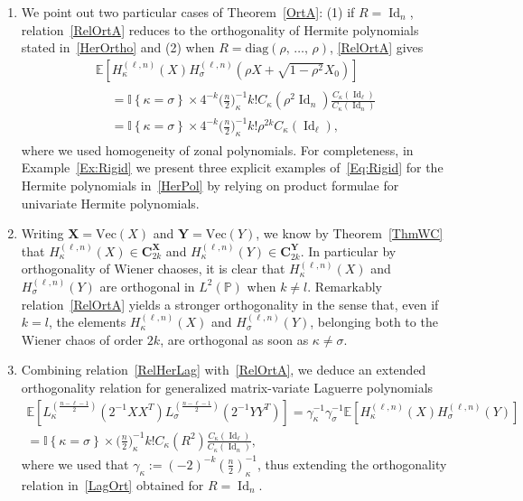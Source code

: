 \documentclass[AHL,Unicode,longabstracts,published]{cedram}
\DeclareMathOperator{\Id}{Id}
\newcommand{\diag}{\mathrm{diag}}
\renewcommand{\Vec}{\mathrm{Vec}}
\newcommand{\bfX}{\mathbf{X}}
\newcommand{\bfC}{\mathbf{C}}
\newcommand{\bfY}{\mathbf{Y}}
\newcommand{\Prob}{\mathbb{P}}
\newcommand{\E}[1]{\mathbb{E}\left[#1\right]}
\newcommand{\eqLaw}{ \overset{\mathcal{L}}{=} }
\newcommand{\ind}[1]{\mathbb{I}
\left\{#1\right\}}
\begin{document}
\begin{rema}
\begin{enumerate}
\begin{multline*}
\end{multline*}
where we used the fact that $f(X)=f(XO)$ and $g(XO^T)=g(X)$ since $f,g\in \Pi(\ell,n)$ as well as the fact that $(XO,X_0O)\eqLaw(X,X_0)$, showing in particular that $|r_j|\leq 1$ for every $j=1,\,\ldots,\,n$.
\item We point out two particular cases of Theorem~\ref{OrtA}: (1) if $R=\Id_n$, relation~\eqref{RelOrtA} reduces to the orthogonality of Hermite polynomials stated in~\eqref{HerOrtho} and (2) when $R= \diag(\rho,\,\ldots,\,\rho)$, \eqref{RelOrtA} gives
\begin{multline}\label{Eq:Rigid}
\E{H_{\kappa}^{(\ell,n)}(X) H_{\sigma}^{(\ell,n)}\left(\rho X+\sqrt{1-\rho^2}X_0\right)}\\
\begin{aligned}
&= \ind{\kappa=\sigma}\times 4^{-k}\bigg(\frac{n}{2}\bigg)_{\kappa}^{-1} k ! C_{\kappa}\left(\rho^2 \Id_n\right)\frac{C_{\kappa}(\Id_{\ell})}{C_{\kappa}(\Id_n)} \\
&= \ind{\kappa=\sigma}\times 4^{-k}\bigg(\frac{n}{2}\bigg)_{\kappa}^{-1} k ! \rho^{2k}C_{\kappa}(\Id_{\ell}), 
\end{aligned}
\end{multline}
where we used homogeneity of zonal polynomials. For completeness, in Example~\ref{Ex:Rigid} we present three explicit examples of~\eqref{Eq:Rigid} for the Hermite polynomials in~\eqref{HerPol} by relying on product formulae for univariate Hermite polynomials.
\item Writing $\bfX = \Vec(X)$ and $ \bfY = \Vec(Y)$, we know by Theorem~\ref{ThmWC} that $H_{\kappa}^{(\ell,n)}(X) \in \bfC_{2k}^{\bfX}$ and $H_{\kappa}^{(\ell,n)}(Y) \in \bfC_{2k}^{\bfY}$. In particular by orthogonality of Wiener chaoses, it is clear that $H_{\kappa}^{(\ell,n)}(X)$ and $H_{\sigma}^{(\ell,n)}(Y)$ are orthogonal in $L^2(\Prob)$ when $k\neq l$. Remarkably relation~\eqref{RelOrtA} yields a stronger orthogonality in the sense that, even if $k=l$, the elements $H_{\kappa}^{(\ell,n)}(X)$ and $H_{\sigma}^{(\ell,n)}(Y)$, belonging both to the Wiener chaos of order $2k$, are orthogonal as soon as $\kappa \neq \sigma$.
\item Combining relation~\eqref{RelHerLag} with~\eqref{RelOrtA}, we deduce an extended orthogonality relation for generalized matrix-variate Laguerre polynomials
\begin{gather*}
\E{L_{\kappa}^{\left(\frac{n-\ell-1}{2}\right)}\left(2^{-1}XX^T\right) L_{\sigma}^{\left(\frac{n-\ell-1}{2}\right)}\left(2^{-1}YY^T\right)} = \gamma_{\kappa}^{-1}
\gamma_{\sigma}^{-1}
\E{H_{\kappa}^{(\ell,n)}(X)H_{\sigma}^{(\ell,n)}(Y)}\\
= \ind{\kappa=\sigma}\times \bigg(\frac{n}{2}\bigg)_{\kappa}^{-1} k ! C_{\kappa}(R^2)\frac{C_{\kappa}(\Id_{\ell})}{C_{\kappa}(\Id_n)},
\end{gather*}
where we used that $\gamma_{\kappa}:=(-2)^{-k} (\frac{n}{2})_{\kappa}^{-1}$, thus extending the orthogonality relation in~\eqref{LagOrt} obtained for $R=\Id_n$.
\end{enumerate}
\end{rema}
\end{document}
